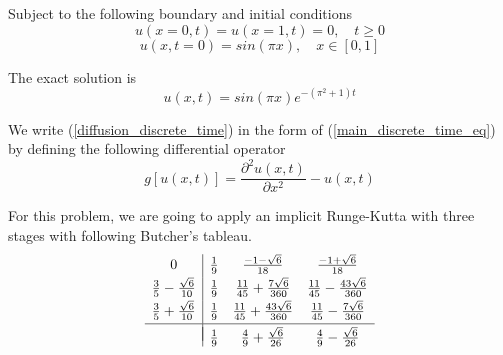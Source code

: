 \documentclass[a4paper,12pt]{article}
\theoremstyle{definition}
\begin{document}
Subject to the following boundary and initial conditions
\begin{equation}
u(x = 0, t) = u(x= 1, t) = 0, \quad t \ge 0
\end{equation}
\begin{equation}
u(x, t=0) = sin(\pi x), \quad x \in [0, 1] 
\end{equation}

The exact solution is 
\begin{equation}
u(x,t) = sin(\pi x) e^{-(\pi^2 + 1)t}
\end{equation}

We write (\ref{diffusion_discrete_time}) in the form of (\ref{main_discrete_time_eq}) 
by defining the following differential operator
\begin{equation}
g[u(x,t)] = \frac{\partial^2 u(x,t)}{\partial x^2} - u(x, t)
\end{equation}

For this problem, we are going to apply an implicit Runge-Kutta with three stages with following
Butcher's tableau.
\begin{equation}
\begin{array}{c|ccc}
    0 & \frac{1}{9} &  \frac{-1-\sqrt{6}}{18} &  
    \frac{-1+\sqrt{6}}{18}\\[0.25em]
    \frac{3}{5} - \frac{\sqrt{6}}{10} & \frac{1}{9} & \frac{11}{45} + 
    \frac{7\sqrt{6}}{360} & \frac{11}{45} - \frac{43\sqrt{6}}{360} \\[0.25em]
    \frac{3}{5} + \frac{\sqrt{6}}{10} & \frac{1}{9} &
    \frac{11}{45} + \frac{43\sqrt{6}}{360} & \frac{11}{45} - \frac{7\sqrt{6}}{360}\\[0.25em]
    \hline \\[-1em]
    & \frac{1}{9} & \frac{4}{9} + \frac{\sqrt{6}}{26} &
    \frac{4}{9} - \frac{\sqrt{6}}{26}
    \end{array}
\end{equation}
\end{document}
